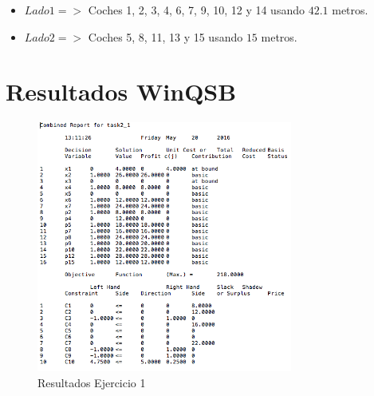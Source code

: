 \documentclass[10pt, a4paper]{article}
\begin{document}
			\begin{itemize}
				\item \(Lado 1 => \) Coches 1, 2, 3, 4, 6, 7, 9, 10, 12 y 14 usando $42.1$ metros.

				\item \(Lado 2 => \) Coches 5, 8, 11, 13 y 15 usando $15$ metros.
			\end{itemize}


	\section{Resultados WinQSB}

		\begin{figure}[H]
		\centering
			\includegraphics[width=0.75\textwidth]{res/exercise-1-result.png}
			\caption{Resultados Ejercicio 1}
  			\label{fig:ej1}
		\end{figure}
\end{document}
